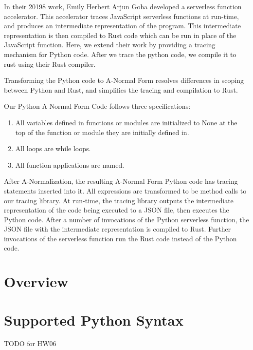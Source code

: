 \documentclass[acmsmall,review,authorversion]{acmart}
\begin{document}
In their 20198 work, Emily Herbert Arjun Goha developed a serverless function accelerator. This accelerator traces JavaScript serverless functions at run-time, and produces an intermediate representation of the program. This intermediate representation is then compiled to Rust code which can be run in place of the JavaScript function. Here, we extend their work by providing a tracing mechanism for Python code. After we trace the python code, we compile it to rust using their Rust compiler. 
 \par
 Transforming the Python code to A-Normal Form resolves differences in scoping between Python and Rust, and simplifies the tracing and compilation to Rust.
 \par
 Our Python A-Normal Form Code follows three specifications:
\begin{enumerate}
    \item All variables defined in functions or modules are initialized to None at the top of the function or module they are initially defined in. 
    \item All loops are while loops.
    \item All function applications are named.
\end{enumerate}
After A-Normalization, the resulting A-Normal Form Python code has tracing statements inserted into it. All expressions are transformed to be method calls to our tracing library. At run-time, the tracing library outputs the intermediate representation of the code being executed to a JSON file, then executes the Python code. After a number of invocations of the Python serverless function, the JSON file with the intermediate representation is compiled to Rust. Further invocations of the serverless function run the Rust code instead of the Python code. 

\section{Overview}

\section{Supported Python Syntax}

TODO for HW06
\end{document}

